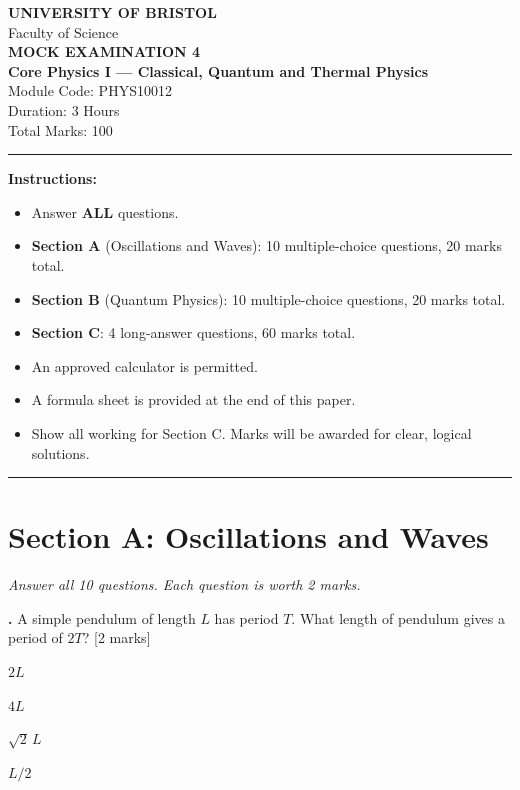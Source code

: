 \documentclass[12pt,a4paper]{article}
\newcounter{mcqcounter}
\newcommand{\mcq}[1]{%
  \stepcounter{mcqcounter}%
  \vspace{0.3cm}%
  \noindent\textbf{\themcqcounter.} #1 \hfill [2 marks]%
  \vspace{0.1cm}%
}
\begin{document}
\begin{center}
{\Large\textbf{UNIVERSITY OF BRISTOL}}\\[0.3cm]
{\large Faculty of Science}\\[0.5cm]
{\Large\textbf{MOCK EXAMINATION 4}}\\[0.3cm]
{\large\textbf{Core Physics I --- Classical, Quantum and Thermal Physics}}\\[0.2cm]
{\large Module Code: PHYS10012}\\[0.5cm]
{\large Duration: 3 Hours}\\[0.3cm]
{\large Total Marks: 100}\\[0.5cm]
\end{center}

\noindent\rule{\textwidth}{0.4pt}

\vspace{0.3cm}
\noindent\textbf{Instructions:}
\begin{itemize}[itemsep=0.1cm]
\item Answer \textbf{ALL} questions.
\item \textbf{Section A} (Oscillations and Waves): 10 multiple-choice questions, 20 marks total.
\item \textbf{Section B} (Quantum Physics): 10 multiple-choice questions, 20 marks total.
\item \textbf{Section C}: 4 long-answer questions, 60 marks total.
\item An approved calculator is permitted.
\item A formula sheet is provided at the end of this paper.
\item Show all working for Section C. Marks will be awarded for clear, logical solutions.
\end{itemize}

\noindent\rule{\textwidth}{0.4pt}
\newpage

\section*{Section A: Oscillations and Waves}
\noindent\textit{Answer all 10 questions. Each question is worth 2 marks.}\\[0.3cm]

\setcounter{mcqcounter}{0}

\mcq{A simple pendulum of length $L$ has period $T$. What length of pendulum gives a period of $2T$?}
\begin{choices}
\item $2L$
\item $4L$
\item $\sqrt{2}\,L$
\item $L/2$
\end{choices}
\end{document}
